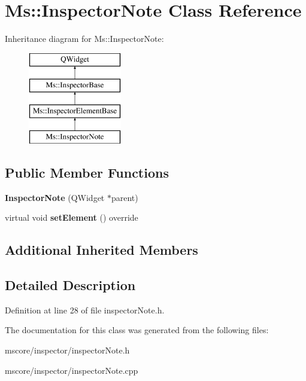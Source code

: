 \hypertarget{class_ms_1_1_inspector_note}{}\section{Ms\+:\+:Inspector\+Note Class Reference}
\label{class_ms_1_1_inspector_note}
Inheritance diagram for Ms\+:\+:Inspector\+Note\+:\begin{figure}[H]
\begin{center}
\leavevmode
\includegraphics[height=4.000000cm]{class_ms_1_1_inspector_note}
\end{center}
\end{figure}
\subsection*{Public Member Functions}
\begin{DoxyCompactItemize}
\item 
\mbox{\label{class_ms_1_1_inspector_note_ab64c6b644d47d058666427804af9bf59}} 
{\bfseries Inspector\+Note} (Q\+Widget $\ast$parent)
\item 
\mbox{\label{class_ms_1_1_inspector_note_a39a607fee424548226a22a0c29abf13c}} 
virtual void {\bfseries set\+Element} () override
\end{DoxyCompactItemize}
\subsection*{Additional Inherited Members}


\subsection{Detailed Description}


Definition at line 28 of file inspector\+Note.\+h.



The documentation for this class was generated from the following files\+:\begin{DoxyCompactItemize}
\item 
mscore/inspector/inspector\+Note.\+h\item 
mscore/inspector/inspector\+Note.\+cpp\end{DoxyCompactItemize}
